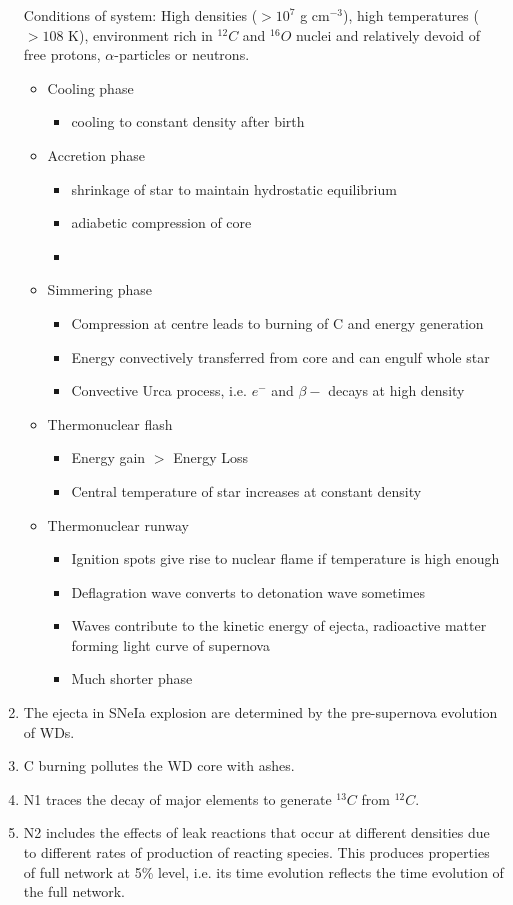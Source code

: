 \documentclass[11pt]{article}
\begin{document}
\begin{enumerate}
			Conditions of system: High densities ($>10^7$ g cm$^{-3}$), high temperatures ($>108$ K),  environment rich in $^{12}C$ and $^{16}O$ nuclei and relatively devoid of free protons, $\alpha$-particles or neutrons. 
			\begin{itemize}
				\item Cooling phase 
					\begin{itemize}
						\item cooling to constant density after birth
					\end{itemize}						
				\item Accretion phase 
					\begin{itemize}
						\item shrinkage of star to maintain hydrostatic equilibrium
						\item adiabetic compression of core
						\item 
					\end{itemize}									
				\item Simmering phase 
					\begin{itemize}
						\item Compression at centre leads to burning of C and energy generation
						\item Energy convectively transferred from core and can engulf whole star
						\item Convective Urca process, i.e. $e^-$ and $\beta-$ decays at high density
					\end{itemize}					
				\item Thermonuclear flash
					\begin{itemize}
						\item Energy gain $>$ Energy Loss 
						\item Central temperature of star increases at constant density
					\end{itemize}					
				\item Thermonuclear runway
					\begin{itemize}
						\item Ignition spots give rise to nuclear flame if temperature is high enough
						\item Deflagration wave converts to detonation wave sometimes
						\item Waves contribute to the kinetic energy of ejecta, radioactive matter forming light curve of supernova
						\item Much shorter phase
					\end{itemize}					
			\end{itemize}
		\item The ejecta in SNeIa explosion are determined by the pre-supernova evolution of WDs.
		\item C burning pollutes the WD core with ashes.
		\item N1 traces the decay of major elements to generate $^{13}C$ from $^{12}C$.
		\item N2 includes the effects of leak reactions that occur at different densities due to different rates of production of reacting species. This produces properties of full network at 5\% level, i.e. its time evolution reflects the time evolution of the full network.
	\end{enumerate}
\end{document}
